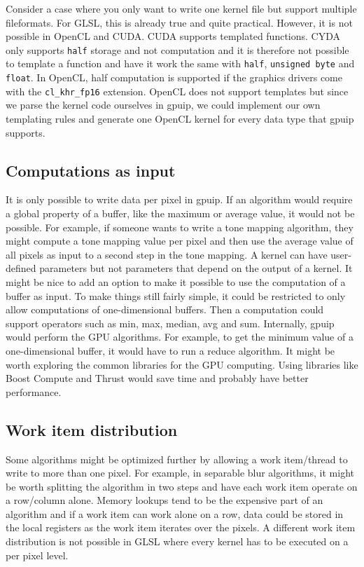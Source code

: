 Consider a case where you only want to write one kernel file but support multiple fileformats. For GLSL, this is already true and quite practical. However, it is not possible in OpenCL and CUDA. CUDA supports templated functions. CYDA only supports {\tt half} storage and not computation and it is therefore not possible to template a function and have it work the same with {\tt half}, {\tt unsigned byte} and {\tt float}. In OpenCL, half computation is supported if the graphics drivers come with the {\tt cl\_khr\_fp16} extension. OpenCL does not support templates but since we parse the kernel code ourselves in gpuip, we could implement our own templating rules and generate one OpenCL kernel for every data type that gpuip supports. 

\subsection{Computations as input}

It is only possible to write data per pixel in gpuip. If an algorithm would require a global property of a buffer, like the maximum or average value, it would not be possible. For example, if someone wants to write a tone mapping algorithm, they might compute a tone mapping value per pixel and then use the average value of all pixels as input to a second step in the tone mapping. A kernel can have user-defined parameters but not parameters that depend on the output of a kernel. It might be nice to add an option to make it possible to use the computation of a buffer as input. To make things still fairly simple, it could be restricted to only allow computations of one-dimensional buffers. Then a computation could support operators such as min, max, median, avg and sum. Internally, gpuip would perform the GPU algorithms. For example, to get the minimum value of a one-dimensional buffer, it would have to run a reduce algorithm. It might be worth exploring the common libraries for the GPU computing. Using libraries like Boost Compute\cite{boostcompute} and Thrust\cite{cudathrust} would save time and probably have better performance.

\subsection{Work item distribution}

Some algorithms might be optimized further by allowing a work item/thread to write to more than one pixel. For example, in separable blur algorithms, it might be worth splitting the algorithm in two steps and have each work item operate on a row/column alone. Memory lookups tend to be the expensive part of an algorithm and if a work item can work alone on a row, data could be stored in the local registers as the work item iterates over the pixels. A different work item distribution is not possible in GLSL where every kernel has to be executed on a per pixel level.
